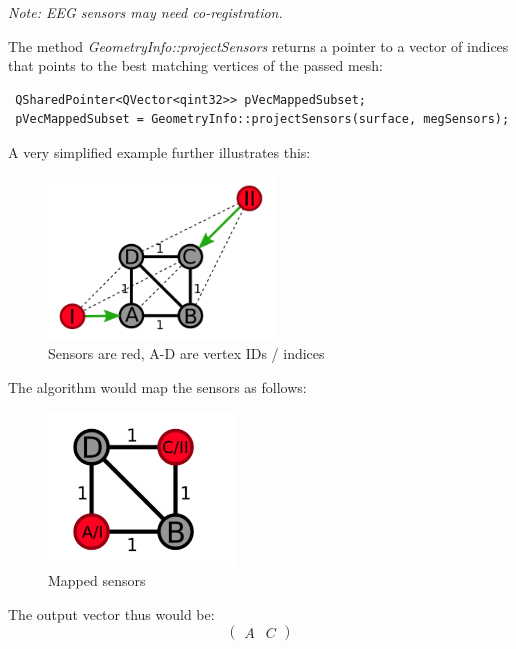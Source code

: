 \begin{center}
\textit{Note: EEG sensors may need co-registration.}
\end{center}

The method \textit{GeometryInfo::projectSensors} returns a pointer to a vector of indices that points to the best matching vertices of the passed mesh:
\begin{lstlisting}
 QSharedPointer<QVector<qint32>> pVecMappedSubset;
 pVecMappedSubset = GeometryInfo::projectSensors(surface, megSensors);
\end{lstlisting}

A very simplified example further illustrates this:

\begin{figure}[h]
	\begin{center}
		\includegraphics[width=6cm]{figures/sensorMappingSimpleBefore.png}
		\caption{Sensors are red, A-D are vertex IDs / indices}
	\end{center}
\end{figure}

\clearpage

The algorithm would map the sensors as follows:

\begin{figure}[h]
	\begin{center}
		\includegraphics[width=5cm]{figures/sensorMappingSimpleAfter.png}
		\caption{Mapped sensors}
	\end{center}
\end{figure}

The output vector thus would be:
\[
\begin{pmatrix} A & C \end{pmatrix}
\]

